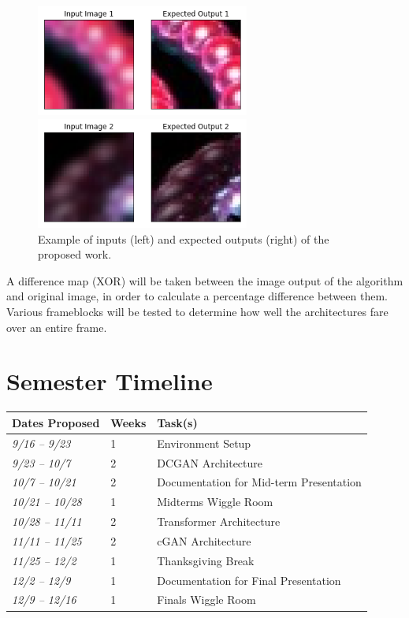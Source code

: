 \documentclass[letterpaper]{article} %
\begin{document}
\begin{figure}[htbp]
\centerline{\includegraphics[width=7cm]{training_pair_1.png}}
\centerline{\includegraphics[width=7cm]{training_pair_2.png}}
\caption{Example of inputs (left) and expected outputs (right) of the proposed work.}
\label{fig:training_pair}
\end{figure}

A difference map (XOR) will be taken between the image output of the algorithm
and original image, in order to calculate a percentage difference between them.
Various frameblocks will be tested to determine how well the architectures fare over
an entire frame.

\section{Semester Timeline}
\label{subsec:semester_plan}
\bgroup
\def\arraystretch{1.5}
\begin{tabular}{| m{} m{} m{}|} 
\hline
Dates Proposed & Weeks & Task(s) \\ 
\hline
\hline
\textit{9/16 -- 9/23} & 1 & Environment Setup \\ 
\hline
\textit{9/23 -- 10/7} & 2 & DCGAN Architecture \\ 
\hline
\textit{10/7 -- 10/21} & 2 & Documentation for Mid-term Presentation \\ 
\hline
\textit{10/21 -- 10/28} & 1 & Midterms Wiggle Room \\ 
\hline
\textit{10/28 -- 11/11} & 2 & Transformer Architecture \\ 
\hline
\textit{11/11 -- 11/25} & 2 & cGAN Architecture \\ 
\hline
\textit{11/25 -- 12/2} & 1 & Thanksgiving Break \\ 
\hline
\textit{12/2 -- 12/9} & 1 & Documentation for Final Presentation \\ 
\hline
\textit{12/9 -- 12/16} & 1 & Finals Wiggle Room \\ 
\hline
\end{tabular}
\egroup
\end{document}
